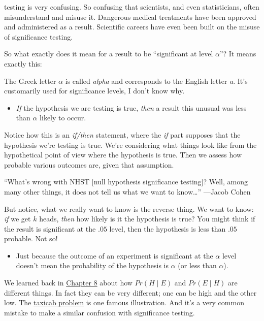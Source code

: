 \documentclass[justified]{tufte-book}
\newcommand{\given}{\mid}
\newcommand{\p}{Pr}
\newenvironment{warning}{\begin{itemize}\item[\faBan]}{\end{itemize}}
\theoremstyle{definition}
\theoremstyle{definition}
\theoremstyle{definition}
\theoremstyle{remark}
\begin{document}
 testing is very confusing. So confusing that
scientists, and even statisticians, often misunderstand and misuse it.
Dangerous medical treatments have been approved and administered as a
result. Scientific careers have even been built on the misuse of
significance testing.

So what exactly does it mean for a result to be ``significant at level
\(\alpha\)''? It means exactly this:

\begin{marginfigure}
The Greek letter \(\alpha\) is called \emph{alpha} and corresponds to
the English letter \emph{a}. It's customarily used for significance
levels, I don't know why.
\end{marginfigure}

\begin{warning}
\emph{If} the hypothesis we are testing is true, \emph{then} a result
this unusual was less than \(\alpha\) likely to occur.
\end{warning}

Notice how this is an \emph{if/then} statement, where the \emph{if} part
supposes that the hypothesis we're testing is true. We're considering
what things look like from the hypothetical point of view where the
hypothesis is true. Then we assess how probable various outcomes are,
given that assumption.

\begin{marginfigure}
``What's wrong with NHST {[}null hypothesis significance testing{]}?
Well, among many other things, it does not tell us what we want to
know\ldots{}'' ---Jacob Cohen
\end{marginfigure}

But notice, what we really want to know is the reverse thing. We want to
know: \emph{if} we get \(k\) heads, \emph{then} how likely is it the
hypothesis is true? You might think if the result is significant at the
\(.05\) level, then the hypothesis is less than \(.05\) probable. Not
so!

\begin{warning}
Just because the outcome of an experiment is significant at the
\(\alpha\) level doesn't mean the probability of the hypothesis is
\(\alpha\) (or less than \(\alpha\)).
\end{warning}

We learned back in \protect\hyperlink{bayes-theorem}{Chapter 8} about
how \(\p(H \given E)\) and \(\p(E \given H)\) are different things. In
fact they can be very different; one can be high and the other low. The
\protect\hyperlink{fig:taxigrid}{taxicab problem} is one famous
illustration. And it's a very common mistake to make a similar confusion
with significance testing.
\end{document}
